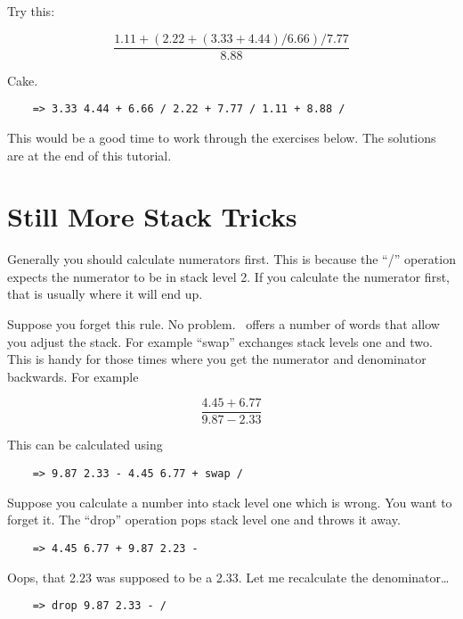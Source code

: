 Try this:

\begin{displaymath}
     \frac{1.11 + (2.22 + (3.33 + 4.44)/6.66 ) / 7.77 }{8.88}
\end{displaymath}

Cake.

\begin{verbatim}
    => 3.33 4.44 + 6.66 / 2.22 + 7.77 / 1.11 + 8.88 /
\end{verbatim}

This would be a good time to work through the exercises below. The solutions are at the end of
this tutorial.

\section{Still More Stack Tricks}

Generally you should calculate numerators first. This is because the ``/'' operation expects the
numerator to be in stack level 2. If you calculate the numerator first, that is usually where it
will end up.

Suppose you forget this rule. No problem. \CLAC\ offers a number of words that allow you adjust
the stack. For example ``swap'' exchanges stack levels one and two. This is handy for those
times where you get the numerator and denominator backwards. For example

\begin{displaymath}
     \frac{ 4.45 + 6.77 }{ 9.87 - 2.33 }
\end{displaymath}

This can be calculated using

\begin{verbatim}
    => 9.87 2.33 - 4.45 6.77 + swap /
\end{verbatim}

Suppose you calculate a number into stack level one which is wrong. You want to forget it. The
``drop'' operation pops stack level one and throws it away.

\begin{verbatim}
    => 4.45 6.77 + 9.87 2.23 -
\end{verbatim}

Oops, that 2.23 was supposed to be a 2.33. Let me recalculate the denominator\ldots

\begin{verbatim}
    => drop 9.87 2.33 - /
\end{verbatim}

